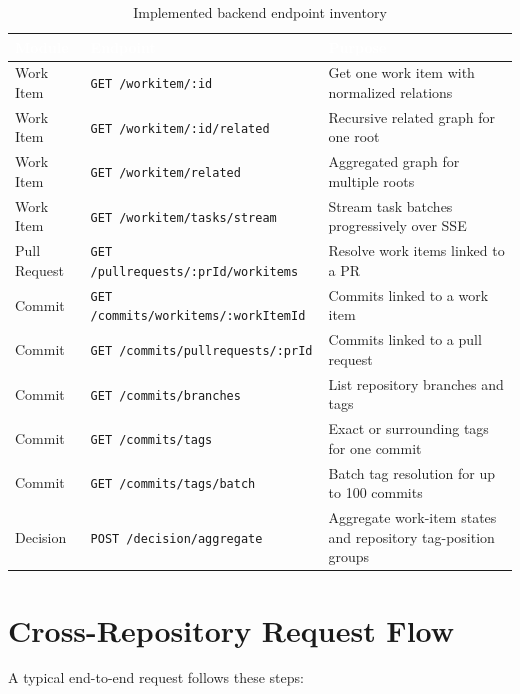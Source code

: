 \documentclass[12pt,a4paper]{report}
\newcommand{\code}[1]{\texttt{\small\color{codered}#1}}
\begin{document}
\begin{table}[H]
\centering
\caption{Implemented backend endpoint inventory}
\label{tab:endpoint-inventory}
\begin{tabularx}{\textwidth}{|p{3.2cm}|p{5.5cm}|X|}
\hline
\rowcolor{primary}
  \textcolor{white}{\textbf{Module}} &
  \textcolor{white}{\textbf{Endpoint}} &
  \textcolor{white}{\textbf{Purpose}} \\
\hline
Work Item    & \code{GET /workitem/:id}                     & Get one work item with normalized relations \\
Work Item    & \code{GET /workitem/:id/related}             & Recursive related graph for one root \\
Work Item    & \code{GET /workitem/related}                 & Aggregated graph for multiple roots \\
Work Item    & \code{GET /workitem/tasks/stream}            & Stream task batches progressively over SSE \\
Pull Request & \code{GET /pullrequests/:prId/workitems}     & Resolve work items linked to a PR \\
Commit       & \code{GET /commits/workitems/:workItemId}    & Commits linked to a work item \\
Commit       & \code{GET /commits/pullrequests/:prId}       & Commits linked to a pull request \\
Commit       & \code{GET /commits/branches}                 & List repository branches and tags \\
Commit       & \code{GET /commits/tags}                     & Exact or surrounding tags for one commit \\
Commit       & \code{GET /commits/tags/batch}               & Batch tag resolution for up to 100 commits \\
Decision     & \code{POST /decision/aggregate}              & Aggregate work-item states and repository tag-position groups \\
\hline
\end{tabularx}
\end{table}

\section{Cross-Repository Request Flow}

A typical end-to-end request follows these steps:
\end{document}
